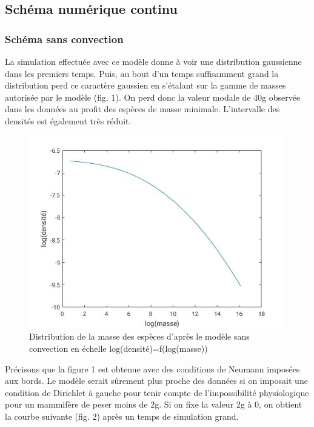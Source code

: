 \documentclass[fleqn,10pt]{SelfArx}
\begin{document}
\subsection*{Schéma numérique continu}
\subsubsection*{Schéma sans convection }
La simulation effectuée avec ce modèle donne à voir une distribution gaussienne dans les premiers temps. Puis, au bout d'un temps suffisamment grand la distribution perd ce caractère gaussien en s'étalant sur la gamme de masses autorisée par le modèle (fig. 1). On perd donc la valeur modale de 40g observée dans les données au profit des espèces de masse minimale. L'intervalle des densités est également très réduit.

\begin{figure}[H]
\includegraphics[scale=0.4]{courbe_neuneu_sans.jpg}
\caption{Distribution de la masse des espèces d'après le modèle sans convection en échelle log(densité)=f(log(masse))}
\end{figure}

Précisons que la figure 1 est obtenue avec des conditions de Neumann imposées aux bords. Le modèle serait sûrement plus proche des données si on imposait une condition de Dirichlet à gauche pour tenir compte de l'impossibilité physiologique pour un mammifère de peser moins de 2g. Si on fixe la valeur 2g à 0, on obtient la courbe suivante (fig. 2) après un temps de simulation grand.
\end{document}
